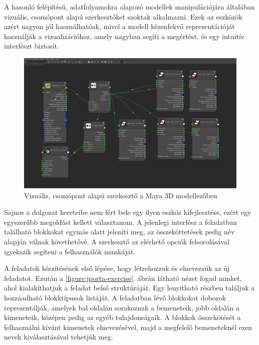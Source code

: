 A hasonló felépítésű, adatfolyamokra alapozó modellek manipulációjára általában vizuális, csomópont alapú szerkesztőket szoktak alkalmazni.
Ezek az eszközök azért nagyon jól használhatóak, mivel a modell kézenfekvő reprezentációját használják a vizualizációhoz, amely nagyban segíti a megértést, és egy intuitív interfészt biztosít.
\begin{figure}[h]
    \centering
    \includegraphics[width=\textwidth]{figures/node-based-editor}
    \caption[Vizuális, csomópont alapú szerkesztő a Maya 3D modellezőben]{Vizuális, csomópont alapú szerkesztő a Maya 3D modellezőben\footnotemark}
    \label{figure:node-based-editor}
\end{figure}

Sajnos a dolgozat kereteibe nem fért bele egy ilyen eszköz kifejlesztése, ezért egy egyszerűbb megoldást kellett választanom.
A jelenlegi interfész a feladatban található blokkokat egymás alatt jeleníti meg, az összeköttetések pedig név alapján válnak követhetővé.
A szerkesztő az elérhető opciók felsorolásával igyekszik segíteni a felhasználók munkáját.

A feladatok készítésének első lépése, hogy létrehozzuk és elnevezzük az új feladatot.
Ezután a \ref{figure:jporta-exercise}. ábrán látható nézet fogad minket, ahol kialakíthatjuk a feladat belső struktúráját.
Egy lenyitható részben találjuk a hozzáadható blokktípusok listáját.
A feladatban lévő blokkokat dobozok reprezentálják, amelyek bal oldalán sorakoznak a bemeneteik, jobb oldalán a kimeneteik, középen pedig az egyéb tulajdonságaik.
A blokkok összekötését a felhasználni kívánt kimenetek elnevezésével, majd a megfelelő bemeneteknél ezen nevek kiválasztásával tehetjük meg.

